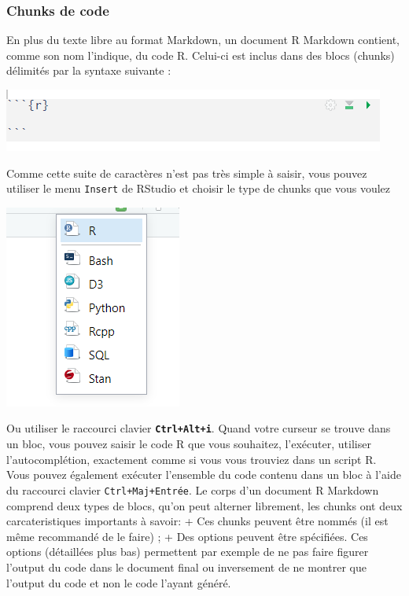 \documentclass[
  12pt,
]{article}
\begin{document}
\subsubsection{Chunks de code}\label{chunks-de-code}

En plus du texte libre au format Markdown, un document R Markdown
contient, comme son nom l'indique, du code R. Celui-ci est inclus dans
des blocs (chunks) délimités par la syntaxe suivante :

\begin{center}\includegraphics[width=1\linewidth,height=1\textheight]{../Document_Rmarkdown/Images/Chunk} \end{center}

Comme cette suite de caractères n'est pas très simple à saisir, vous
pouvez utiliser le menu \texttt{Insert} de RStudio et choisir le type de
chunks que vous voulez

\begin{center}\includegraphics[width=0.3\linewidth,height=0.3\textheight]{../Document_Rmarkdown/Images/Type_chunk} \end{center}

Ou utiliser le raccourci clavier \textbf{\texttt{Ctrl+Alt+i}}. Quand
votre curseur se trouve dans un bloc, vous pouvez saisir le code R que
vous souhaitez, l'exécuter, utiliser l'autocomplétion, exactement comme
si vous vous trouviez dans un script R. Vous pouvez également exécuter
l'ensemble du code contenu dans un bloc à l'aide du raccourci clavier
\texttt{Ctrl+Maj+Entrée}. Le corps d'un document R Markdown comprend
deux types de blocs, qu'on peut alterner librement, les chunks ont deux
carcateristiques importants à savoir: + Ces chunks peuvent être nommés
(il est même recommandé de le faire) ; + Des options peuvent être
spécifiées. Ces options (détaillées plus bas) permettent par exemple de
ne pas faire figurer l'output du code dans le document final ou
inversement de ne montrer que l'output du code et non le code l'ayant
généré.
\end{document}
